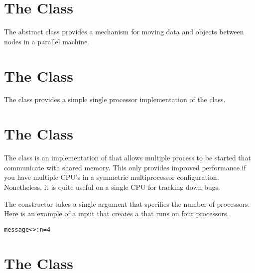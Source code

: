 

\section{The  Class}
\label{MessageGrp}

The  abstract class provides
a mechanism for moving data and objects between
nodes in a parallel machine.


\section{The  Class}
\label{ProcMessageGrp}

The  class provides
a simple single processor implementation of
the  class.


\section{The  Class}
\label{ShmMessageGrp}

The  class is an implementation of
 that allows multiple process to be
started that communicate with shared memory.  This
only provides improved performance if you have multiple
CPU's in a symmetric multiprocessor configuration.  Nonetheless,
it is quite useful on a single CPU for tracking down bugs.

The   constructor takes
a single argument that specifies the number of processors.
Here is an example of a  input that
creates a  that runs on four processors.
\begin{alltt}
message<>: n = 4
\end{alltt}


\section{The  Class}
\label{ParagonMessageGrp}

